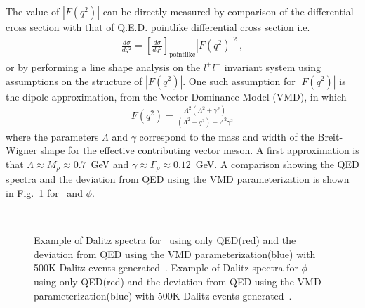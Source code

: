   The value of $\left|F(q^2)\right|$ can be directly measured by comparison of the differential cross section with that of Q.E.D. pointlike differential cross section i.e.
  \begin{align}
  \frac{d\sigma}{dq^{2}} = \left[\frac{d\sigma}{dq^{2}}\right]_{\text{pointlike}}\left| F(q^{2})\right| ^{2}\nonumber \ ,
  \end{align}
  or by performing a line shape analysis on the $l^{+}l^{-}$ invariant system using assumptions on the structure of $\left|F(q^2)\right|$. One such assumption for $\left|F(q^2)\right|$ is the dipole approximation, from the Vector Dominance Model (VMD), in which 
  \begin{align}
  F(q^{2}) = \frac{\Lambda^2(\Lambda^2 + \gamma^2)}{(\Lambda^{2} - q^2) + \Lambda^2\gamma^2 } \nonumber
  \end{align}
  where the parameters $\Lambda$ and $\gamma$ correspond to the mass and width of the Breit-Wigner shape for the effective contributing vector meson. A first approximation is that $\Lambda \approx M_{\rho} \approx 0.7$~GeV and $\gamma \approx \Gamma_{\rho}  \approx 0.12$~GeV. A comparison showing the QED spectra and the deviation from QED using the VMD parameterization is shown in Fig.~\ref{fig:dalitz_compare} for \etaTP  \ and $\phi$.
 \begin{figure}[h!]\begin{center}
 		\\
 		\caption[Dalitz  for \etaTP \ and $\phi$]{\label{fig:dalitz_compare}Example of Dalitz spectra for \etaTP \ using only QED(red) and the deviation from QED using the VMD parameterization(blue) with 500K Dalitz events generated~.  Example of Dalitz  spectra for $\phi$ using only QED(red) and the deviation from QED using the VMD parameterization(blue)  with 500K Dalitz events generated~. }
 	\end{center}\end{figure}
 	 
